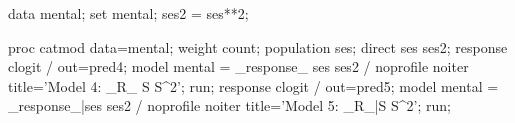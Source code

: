 \begin{listing}
data mental;
   set mental;
   ses2 = ses**2;

proc catmod data=mental;
   weight count;
   population ses;
   direct ses ses2;
   response clogit / out=pred4;
   model mental = _response_ ses ses2 / noprofile noiter title='Model 4: _R_ S S^2';
  run;
   response clogit / out=pred5;
   model mental = _response_|ses ses2 / noprofile noiter title='Model 5: _R_|S S^2';
  run;
\end{listing}
